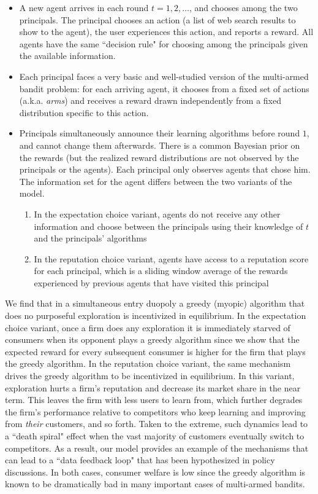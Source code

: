 \begin{itemize}

\item A new agent arrives in each round $t=1,2, \ldots$, and chooses among the two principals. The principal chooses an action (\eg a list of web search results to show to the agent), the user experiences this action, and reports a reward. All agents have the same ``decision rule" for choosing among the principals given the available information.

\item Each principal faces a very basic and well-studied version of the multi-armed bandit problem: for each arriving agent, it chooses from a fixed set of actions  (a.k.a. \emph{arms}) and receives a reward drawn independently from a fixed distribution specific to this action.

\item Principals simultaneously announce their learning algorithms before round $1$, and cannot change them afterwards. There is a common Bayesian prior on the rewards (but the realized reward distributions are not observed by the principals or the agents).  Each principal only observes agents that chose him. The information set for the agent differs between the two variants of the model. \begin{enumerate}
\item In the expectation choice variant, agents do not receive any other information and choose between the principals using their knowledge of $t$ and the principals' algorithms
\item In the reputation choice variant, agents have access to a reputation score for each principal, which is a sliding window average of the rewards experienced by previous agents that have visited this principal
\end{enumerate}
\end{itemize}

We find that in a simultaneous entry duopoly a greedy (myopic) algorithm that does no purposeful exploration is incentivized in equilibrium. In the expectation choice variant, once a firm does any exploration it is immediately starved of consumers when its opponent plays a greedy algorithm since we show that the expected reward for every subsequent consumer is higher for the firm that plays the greedy algorithm. In the reputation choice variant, the same mechanism drives the greedy algorithm to be incentivized in equilibrium. In this variant, exploration hurts a firm's reputation and decrease its market share in the near term. This leaves the firm with less users to learn from, which further degrades the firm's performance relative to competitors who keep learning and improving from \emph{their} customers, and so forth. Taken to the extreme, such dynamics lead to a ``death spiral" effect when the vast majority of customers eventually switch to competitors. As a result, our model provides an example of the mechanisms that can lead to a ``data feedback loop" that has been hypothesized in policy discussions. In both cases, consumer welfare is low since the greedy algorithm is known to be dramatically bad in many important cases of multi-armed bandits.

